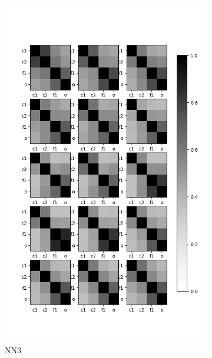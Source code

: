 \documentclass[11pt, twocolumn]{article}
\begin{document}
\begin{figure}
\begin{subfigure}[b]{0.3 \textwidth}
		\includegraphics[width=\textwidth]{figs/nn4_sim.png}
		\caption[]%
		{{\small NN3}}    
		\label{fig:nn3}
	\end{subfigure}
	\hfill
	\begin{subfigure}[b]{0.3\textwidth}   
		\centering 

\end{subfigure}
\end{figure}
\end{document}
